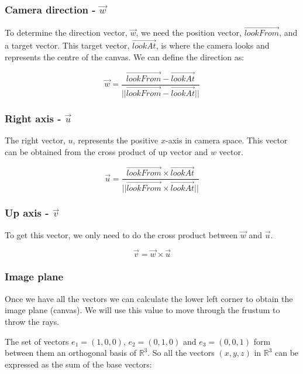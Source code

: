 \documentclass[titlepage,12pt]{report}
\begin{document}
\subsubsection{Camera direction - $\vec{w}$}

To determine the direction vector, $\vec{w}$, we need the position vector, $\vec{lookFrom}$, and a target vector. This target vector, $\vec{lookAt}$, is where the camera looks and represents the centre of the canvas. We can define the direction as:

\begin{equation}
\vec{w} = \frac{\vec{lookFrom} - \vec{lookAt}}{||\vec{lookFrom} - \vec{lookAt}||}
\end{equation}

\subsubsection{Right axis - $\vec{u}$}

The right vector, $u$, represents the positive $x$-axis in camera space. This vector can be obtained from the cross product of up vector and $w$ vector.

\begin{equation}
\vec{u} = \frac{\vec{lookFrom} \times \vec{lookAt}}{||\vec{lookFrom} \times \vec{lookAt}||}
\end{equation}

\subsubsection{Up axis - $\vec{v}$}

To get this vector, we only need to do the cross product between $\vec{w}$ and $\vec{u}$. 

\begin{equation}
\vec{v} = \vec{w} \times \vec{u}
\end{equation}

\subsubsection{Image plane}

Once we have all the vectors we can calculate the lower left corner to obtain the image plane (canvas). We will use this value to move through the frustum to throw the rays.

The set of vectors $e_1 = (1,0,0)$, $e_2 = (0,1,0)$ and $e_3 = (0,0,1)$ form between them an orthogonal basis of $\mathbb{R}^3$. So all the vectors $(x,y,z)$ in $\mathbb{R}^3$ can be expressed as the sum of the base vectors:
\end{document}
